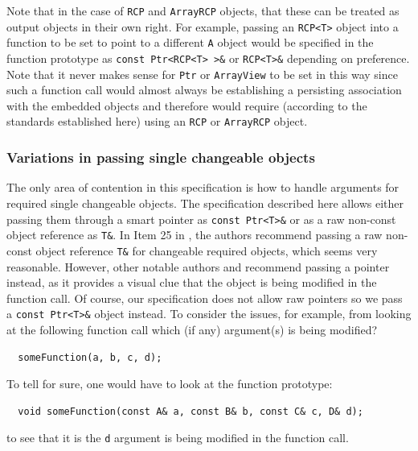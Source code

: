 Note that in the case of {}\texttt{RCP} and {}\texttt{ArrayRCP} objects, that
these can be treated as output objects in their own right.  For example,
passing an {}\texttt{RCP<T>} object into a function to be set to point to a
different {}\texttt{A} object would be specified in the function prototype as
{}\texttt{const Ptr<RCP<T> >\&} or {}\texttt{RCP<T>\&} depending on
preference.  Note that it never makes sense for {}\texttt{Ptr} or
{}\texttt{ArrayView} to be set in this way since such a function call would
almost always be establishing a persisting association with the embedded
objects and therefore would require (according to the standards established
here) using an {}\texttt{RCP} or {}\texttt{ArrayRCP} object.


%
\subsubsection{Variations in passing single changeable objects}
%

The only area of contention in this specification is how to handle
arguments for required single changeable objects.  The specification
described here allows either passing them through a smart pointer as
{}\texttt{const Ptr<T>\&} or as a raw non-const object reference as
{}\texttt{T\&}.  In Item 25 in {}\cite{C++CodingStandards05}, the
authors recommend passing a raw non-const object reference
{}\texttt{T\&} for changeable required objects, which seems very
reasonable.  However, other notable authors {}\cite[Section Section
5.5]{stroustrup97} and {}\cite[Section 13.2]{CodeComplete2nd04}
recommend passing a pointer instead, as it provides a visual clue that
the object is being modified in the function call.  Of course, our
specification does not allow raw pointers so we pass a {}\texttt{const
Ptr<T>\&} object instead.  To consider the issues, for example, from
looking at the following function call which (if any) argument(s) is
being modified?

{\small\begin{verbatim}
  someFunction(a, b, c, d);
\end{verbatim}}

To tell for sure, one would have to look at the function prototype:

{\small\begin{verbatim}
  void someFunction(const A& a, const B& b, const C& c, D& d);
\end{verbatim}}

to see that it is the {}\texttt{d} argument is being modified in the function
call.

